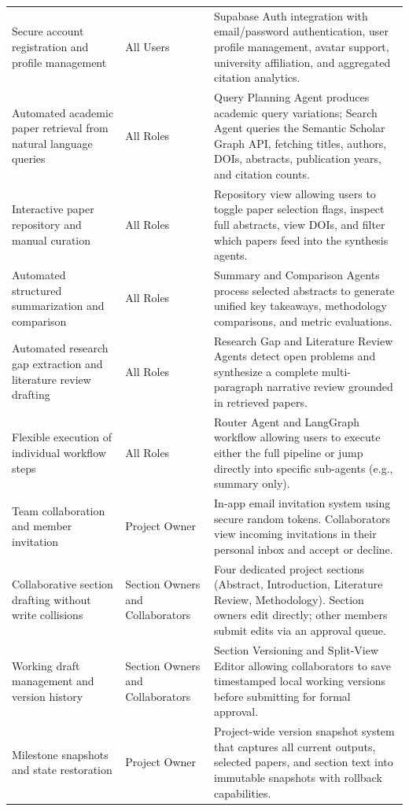 \documentclass[11pt,a4paper]{article}
\begin{document}
\begin{longtable}{p{4.5cm} p{3.2cm} p{7.5cm}}
Secure account registration and profile management & All Users & Supabase Auth integration with email/password authentication, user profile management, avatar support, university affiliation, and aggregated citation analytics. \\
\addlinespace
Automated academic paper retrieval from natural language queries & All Roles & Query Planning Agent produces academic query variations; Search Agent queries the Semantic Scholar Graph API, fetching titles, authors, DOIs, abstracts, publication years, and citation counts. \\
\addlinespace
Interactive paper repository and manual curation & All Roles & Repository view allowing users to toggle paper selection flags, inspect full abstracts, view DOIs, and filter which papers feed into the synthesis agents. \\
\addlinespace
Automated structured summarization and comparison & All Roles & Summary and Comparison Agents process selected abstracts to generate unified key takeaways, methodology comparisons, and metric evaluations. \\
\addlinespace
Automated research gap extraction and literature review drafting & All Roles & Research Gap and Literature Review Agents detect open problems and synthesize a complete multi-paragraph narrative review grounded in retrieved papers. \\
\addlinespace
Flexible execution of individual workflow steps & All Roles & Router Agent and LangGraph workflow allowing users to execute either the full pipeline or jump directly into specific sub-agents (e.g., summary only). \\
\addlinespace
Team collaboration and member invitation & Project Owner & In-app email invitation system using secure random tokens. Collaborators view incoming invitations in their personal inbox and accept or decline. \\
\addlinespace
Collaborative section drafting without write collisions & Section Owners and Collaborators & Four dedicated project sections (Abstract, Introduction, Literature Review, Methodology). Section owners edit directly; other members submit edits via an approval queue. \\
\addlinespace
Working draft management and version history & Section Owners and Collaborators & Section Versioning and Split-View Editor allowing collaborators to save timestamped local working versions before submitting for formal approval. \\
\addlinespace
Milestone snapshots and state restoration & Project Owner & Project-wide version snapshot system that captures all current outputs, selected papers, and section text into immutable snapshots with rollback capabilities. \\
\bottomrule
\end{longtable}
\end{document}
